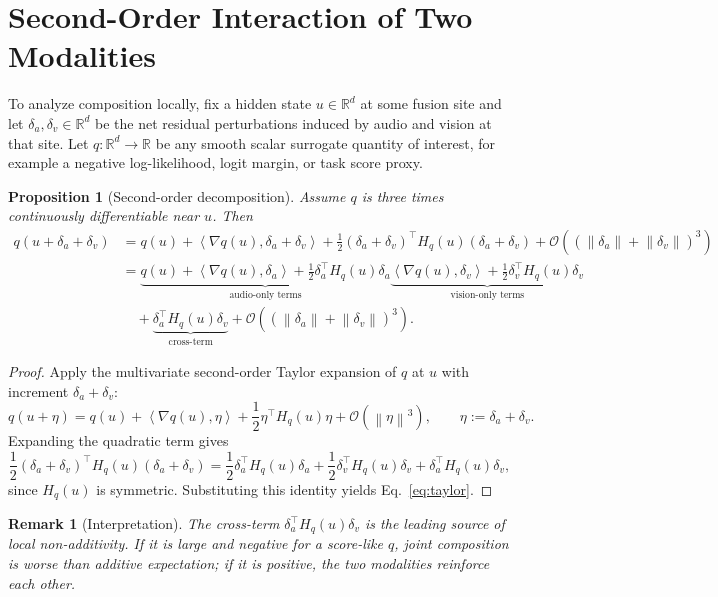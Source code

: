 \documentclass[11pt]{article}
\newcommand{\R}{\mathbb{R}}
\newcommand{\norm}[1]{\left\lVert #1 \right\rVert}
\newcommand{\inner}[2]{\left\langle #1, #2 \right\rangle}
\newcommand{\bigO}{\mathcal{O}}
\newtheorem{proposition}{Proposition}
\newtheorem{remark}{Remark}
\begin{document}
\section{Second-Order Interaction of Two Modalities}

To analyze composition locally, fix a hidden state $u \in \R^d$ at some fusion
site and let $\delta_a, \delta_v \in \R^d$ be the net residual perturbations
induced by audio and vision at that site. Let $q:\R^d \to \R$ be any smooth
scalar surrogate quantity of interest, for example a negative log-likelihood,
logit margin, or task score proxy.

\begin{proposition}[Second-order decomposition]
\label{prop:taylor}
Assume $q$ is three times continuously differentiable near $u$. Then
\begin{align}
q(u + \delta_a + \delta_v)
&=
q(u)
+ \inner{\nabla q(u)}{\delta_a + \delta_v}
+ \frac{1}{2}(\delta_a + \delta_v)^\top H_q(u)(\delta_a + \delta_v)
+ \bigO\!\left((\norm{\delta_a}+\norm{\delta_v})^3\right)
\nonumber\\
&=
\underbrace{q(u) + \inner{\nabla q(u)}{\delta_a}
+ \frac{1}{2}\delta_a^\top H_q(u)\delta_a}_{\text{audio-only terms}}
\underbrace{\inner{\nabla q(u)}{\delta_v}
+ \frac{1}{2}\delta_v^\top H_q(u)\delta_v}_{\text{vision-only terms}}
\nonumber\\
&\quad
+ \underbrace{\delta_a^\top H_q(u)\delta_v}_{\text{cross-term}}
+ \bigO\!\left((\norm{\delta_a}+\norm{\delta_v})^3\right).
\label{eq:taylor}
\end{align}
\end{proposition}

\begin{proof}
Apply the multivariate second-order Taylor expansion of $q$ at $u$ with
increment $\delta_a + \delta_v$:
\[
q(u+\eta)
=
q(u)
+ \inner{\nabla q(u)}{\eta}
+ \frac{1}{2}\eta^\top H_q(u)\eta
+ \bigO(\norm{\eta}^3),
\qquad
\eta := \delta_a + \delta_v.
\]
Expanding the quadratic term gives
\[
\frac{1}{2}(\delta_a+\delta_v)^\top H_q(u)(\delta_a+\delta_v)
=
\frac{1}{2}\delta_a^\top H_q(u)\delta_a
+ \frac{1}{2}\delta_v^\top H_q(u)\delta_v
+ \delta_a^\top H_q(u)\delta_v,
\]
since $H_q(u)$ is symmetric. Substituting this identity yields
Eq.~\eqref{eq:taylor}.
\end{proof}

\begin{remark}[Interpretation]
The cross-term $\delta_a^\top H_q(u)\delta_v$ is the leading source of local
non-additivity. If it is large and negative for a score-like $q$, joint
composition is worse than additive expectation; if it is positive, the two
modalities reinforce each other.
\end{remark}
\end{document}
